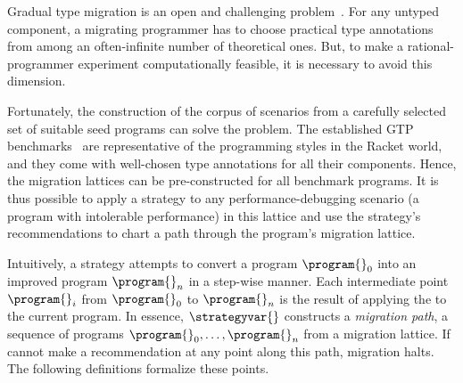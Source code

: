 \newcommand{\gtpurl}{\url{https://docs.racket-lang.org/gtp-benchmarks/index.html}}

Gradual type migration is an open and challenging problem~\cite{rch:in-out-infer-gt, km:ts-type-evo,
mp:gt-decidable, ccew:gt-migrate, gc:gt-infer,
cagg-solver-based-migration,clps-popl-2020,js-infer,ruby-static-infer,unif-infer,
msi:gt-infer-hm,dyn-infer-ruby,profile-guided-typing,jstrace,gen-ts-decl,
lambdanet,nl2ptype,learn-types-big-data,ml-ts}.
For any untyped component, a migrating programmer has to choose
practical type annotations from among an often-infinite number of theoretical
ones. But, to make a rational-programmer experiment computationally feasible, it
is necessary to avoid this dimension.

Fortunately, the construction of the corpus of scenarios from a carefully
selected set of suitable seed programs can solve the problem.
The established GTP
benchmarks~\cite{gtnffvf-jfp-2019,g-rep-2023} are
representative of the programming styles in the Racket world, and they
come with well-chosen type annotations for all their components.  Hence,
the migration lattices can be pre-constructed for all benchmark programs.
It is thus possible to apply a strategy to any performance-debugging
scenario (a program with intolerable performance) in this lattice and
use the strategy's recommendations
to chart a path through the program's migration lattice.

Intuitively, a strategy \strategyvar{} attempts to convert a program $\program{}_0$
into an improved program $\program{}_n$ in  a step-wise manner.
Each intermediate point $\program{}_i$ from $\program{}_0$ to
$\program{}_n$ is the result of applying the \strategyvar{}
to the current program.
In essence,
$\strategyvar{}$ constructs a \emph{migration path}, a sequence of
programs ${\program{}_0}, \ldots, {\program{}_n}$ from a migration
lattice. If \strategyvar{} cannot make a recommendation at any point along
this path, migration halts.
The following definitions formalize these points.

